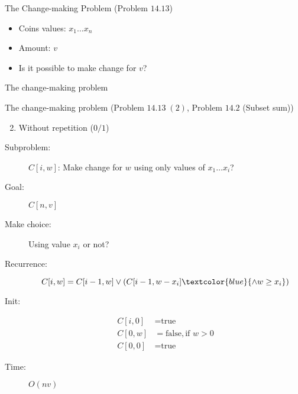 
\begin{frame}{}
  \centerline{}
\end{frame}

\begin{frame}{}
  \begin{exampleblock}{The Change-making Problem (Problem $14.13$)}
    \begin{itemize}
      \item Coins values: $x_{1} \dots x_{n}$
      \item Amount: $v$
      \item Is it possible to make change for $v$?
    \end{itemize}
  \end{exampleblock}
\end{frame}
\begin{frame}{The change-making problem}
  \begin{exampleblock}{The change-making problem (Problem $14.13\; (2)$, Problem $14.2$ (Subset sum))}
    \begin{enumerate}[(1)]
      \setcounter{enumi}{1}
      \item Without repetition ($0/1$)
    \end{enumerate}
  \end{exampleblock}

  \pause
  \begin{description}
	\item[Subproblem:] $C[i, w]$: Make change for $w$ using only values of $x_{1} \dots x_{i}$?
	\item[Goal:] $C[n,v]$
	  \pause
	\item[Make choice:] Using value $x_{i}$ or not?
	\item[Recurrence:] 
	  \[
		C[i,w] = C[i-1, w] \lor (C[i-1, w-x_{i}] \textcolor{blue}{\land w \ge x_{i}})
	  \]
	  \pause
	\item[Init:]
	  \begin{align*}
		C[i,0] &= \text{true}  \\
		C[0,w] &= \text{false}, \text{if } w > 0 \\
		C[0,0] &= \text{true}
	  \end{align*}
	\item[Time:] $O(nv)$
  \end{description}
\end{frame}
